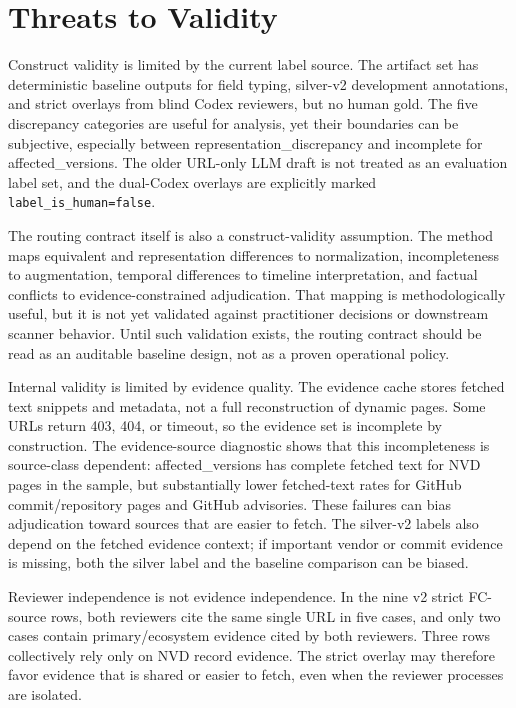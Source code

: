 \section{Threats to Validity}

Construct validity is limited by the current label source. The artifact set has deterministic baseline outputs for field typing, silver-v2 development annotations, and strict overlays from blind Codex reviewers, but no human gold. The five discrepancy categories are useful for analysis, yet their boundaries can be subjective, especially between representation\_discrepancy and incomplete for affected\_versions. The older URL-only LLM draft is not treated as an evaluation label set, and the dual-Codex overlays are explicitly marked \texttt{label\_is\_human=false}.

The routing contract itself is also a construct-validity assumption. The method maps equivalent and representation differences to normalization, incompleteness to augmentation, temporal differences to timeline interpretation, and factual conflicts to evidence-constrained adjudication. That mapping is methodologically useful, but it is not yet validated against practitioner decisions or downstream scanner behavior. Until such validation exists, the routing contract should be read as an auditable baseline design, not as a proven operational policy.

Internal validity is limited by evidence quality. The evidence cache stores fetched text snippets and metadata, not a full reconstruction of dynamic pages. Some URLs return 403, 404, or timeout, so the evidence set is incomplete by construction. The evidence-source diagnostic shows that this incompleteness is source-class dependent: affected\_versions has complete fetched text for NVD pages in the sample, but substantially lower fetched-text rates for GitHub commit/repository pages and GitHub advisories. These failures can bias adjudication toward sources that are easier to fetch. The silver-v2 labels also depend on the fetched evidence context; if important vendor or commit evidence is missing, both the silver label and the baseline comparison can be biased.

Reviewer independence is not evidence independence. In the nine v2 strict FC-source rows, both reviewers cite the same single URL in five cases, and only two cases contain primary/ecosystem evidence cited by both reviewers. Three rows collectively rely only on NVD record evidence. The strict overlay may therefore favor evidence that is shared or easier to fetch, even when the reviewer processes are isolated.

